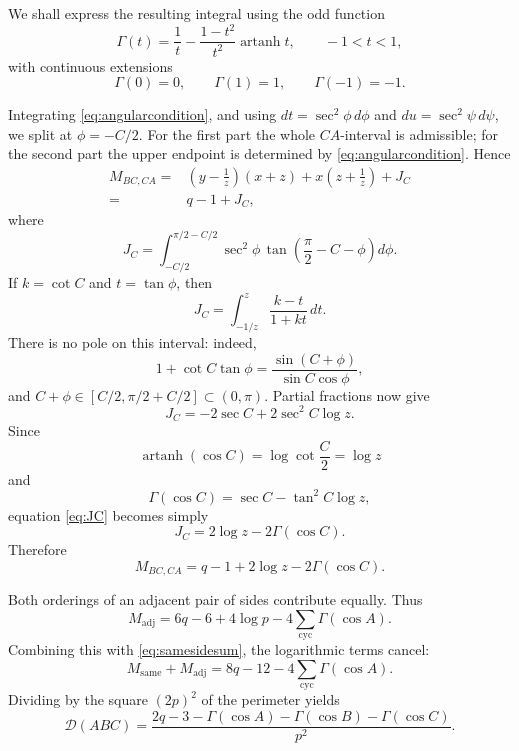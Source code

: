 \documentclass[11pt]{article}
\theoremstyle{definition}
\theoremstyle{remark}
\newcommand{\artanh}{\operatorname{artanh}}
\begin{document}
We shall express the resulting integral using the odd function
\begin{equation}
\label{eq:Gamma}
\Gamma(t)
=
\frac1t-\frac{1-t^2}{t^2}\artanh t,
\qquad -1<t<1,
\end{equation}
with continuous extensions
\[
\Gamma(0)=0,
\qquad
\Gamma(1)=1,
\qquad
\Gamma(-1)=-1.
\]

Integrating \eqref{eq:angularcondition}, and using $dt=\sec^2\phi\,d\phi$ and $du=\sec^2\psi\,d\psi$, we split at $\phi=-C/2$.  For the first part the whole $CA$-interval is admissible; for the second part the upper endpoint is determined by \eqref{eq:angularcondition}.  Hence
\begin{align*}
M_{BC,CA}
={}&\left(y-\frac1z\right)(x+z)
+x\left(z+\frac1z\right)+J_C\\
={}&q-1+J_C,
\end{align*}
where
\[
J_C
=
\int_{-C/2}^{\pi/2-C/2}
\sec^2\phi\,
\tan\left(\frac\pi2-C-\phi\right)d\phi.
\]
If $k=\cot C$ and $t=\tan\phi$, then
\[
J_C
=\int_{-1/z}^{z}\frac{k-t}{1+kt}\,dt.
\]
There is no pole on this interval: indeed,
\[
1+\cot C\tan\phi
=\frac{\sin(C+\phi)}{\sin C\cos\phi},
\]
and $C+\phi\in[C/2,\pi/2+C/2]\subset(0,\pi)$.
Partial fractions now give
\begin{equation}
\label{eq:JC}
J_C=-2\sec C+2\sec^2C\log z.
\end{equation}
Since
\[
\artanh(\cos C)=\log\cot\frac C2=\log z
\]
and
\[
\Gamma(\cos C)=\sec C-\tan^2C\log z,
\]
equation \eqref{eq:JC} becomes simply
\begin{equation}
\label{eq:JCgamma}
J_C=2\log z-2\Gamma(\cos C).
\end{equation}
Therefore
\begin{equation}
\label{eq:adjacent}
M_{BC,CA}=q-1+2\log z-2\Gamma(\cos C).
\end{equation}

Both orderings of an adjacent pair of sides contribute equally.  Thus
\begin{equation}
\label{eq:adjacentsum}
M_{\mathrm{adj}}
=6q-6+4\log p
-4\sum_{\mathrm{cyc}}\Gamma(\cos A).
\end{equation}
Combining this with \eqref{eq:samesidesum}, the logarithmic terms cancel:
\[
M_{\mathrm{same}}+M_{\mathrm{adj}}
=8q-12-4\sum_{\mathrm{cyc}}\Gamma(\cos A).
\]
Dividing by the square $(2p)^2$ of the perimeter yields
\begin{equation}
\label{eq:Gammaform}
\mathcal D(ABC)
=
\frac{2q-3-
\Gamma(\cos A)-\Gamma(\cos B)-\Gamma(\cos C)}{p^2}.
\end{equation}
\end{document}
